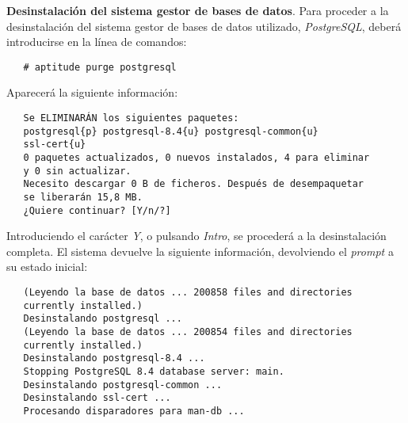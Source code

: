 \item \textbf{Desinstalación del sistema gestor de bases de datos}.
   Para proceder a la desinstalación del sistema gestor de bases de datos
   utilizado, \textit{PostgreSQL}, deberá introducirse en la línea de comandos:

   \begin{verbatim}
   # aptitude purge postgresql
   \end{verbatim}

   Aparecerá la siguiente información:

   \begin{verbatim}
   Se ELIMINARÁN los siguientes paquetes:
   postgresql{p} postgresql-8.4{u} postgresql-common{u}
   ssl-cert{u}
   0 paquetes actualizados, 0 nuevos instalados, 4 para eliminar
   y 0 sin actualizar.
   Necesito descargar 0 B de ficheros. Después de desempaquetar
   se liberarán 15,8 MB.
   ¿Quiere continuar? [Y/n/?]
   \end{verbatim}

   Introduciendo el carácter \textit{Y}, o pulsando \textit{Intro}, se procederá
   a la desinstalación completa. El sistema devuelve la siguiente información,
   devolviendo el \textit{prompt} a su estado inicial:

   \begin{verbatim}
   (Leyendo la base de datos ... 200858 files and directories
   currently installed.)
   Desinstalando postgresql ...
   (Leyendo la base de datos ... 200854 files and directories
   currently installed.)
   Desinstalando postgresql-8.4 ...
   Stopping PostgreSQL 8.4 database server: main.
   Desinstalando postgresql-common ...
   Desinstalando ssl-cert ...
   Procesando disparadores para man-db ...
   \end{verbatim}
